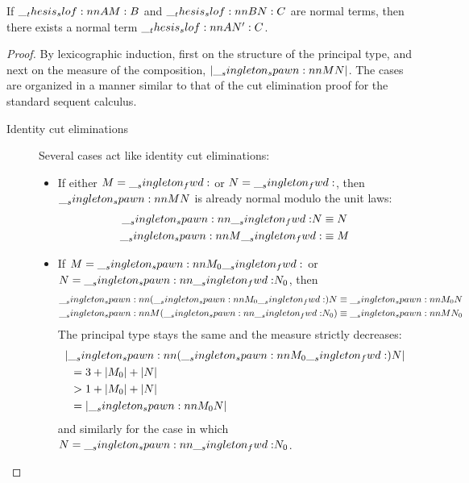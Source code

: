 \begin{theorem}
  If $\slof{A |- M : B}$ and $\slof{B |- N : C}$ are normal terms, then there exists a normal term $\slof{A |- N' : C}$.
\end{theorem}
%
\begin{proof}
  By lexicographic induction, first on the structure of the principal type, and next on the measure of the composition, $\lvert\__singleton_spawn:nn {M} {N}\rvert$.
  The cases are organized in a manner similar to that of the cut elimination proof for the standard sequent calculus.
  \begin{description}
  \item[Identity cut eliminations]
    Several cases act like identity cut eliminations:
    \begin{itemize}
    \item If either $M = \__singleton_fwd:$ or $N = \__singleton_fwd:$, then $\__singleton_spawn:nn {M} {N}$ is already normal modulo the unit laws:
      \begin{gather*}
        \__singleton_spawn:nn {\__singleton_fwd:} {N} \equiv N
        \\
        \__singleton_spawn:nn {M} {\__singleton_fwd:} \equiv M
      \end{gather*}

    \item If $M = \__singleton_spawn:nn {M_0} {\__singleton_fwd:}$ or $N = \__singleton_spawn:nn {\__singleton_fwd:} {N_0}$, then 
      \begin{gather*}
        \__singleton_spawn:nn {(\__singleton_spawn:nn {M_0} {\__singleton_fwd:})} {N}
          \equiv \__singleton_spawn:nn {M_0} {N}
        \\
        \__singleton_spawn:nn {M} {(\__singleton_spawn:nn {\__singleton_fwd:} {N_0})}
          \equiv \__singleton_spawn:nn {M} {N_0}
      \end{gather*}
      The principal type stays the same and the measure strictly decreases:
      \begin{align*}
        \MoveEqLeft[0.5]
        \meas{\spawn{(\spawn{M_0}{\fwd})}{N}} \\
          &= 3 + \meas{M_0} + \meas{N} \\
          &> 1 + \meas{M_0} + \meas{N} \\
          &= \meas{\spawn{M_0}{N}}
      \end{align*}
      and similarly for the case in which $N = \__singleton_spawn:nn {\__singleton_fwd:} {N_0}$.
    \end{itemize}


\end{description}
\end{proof}
